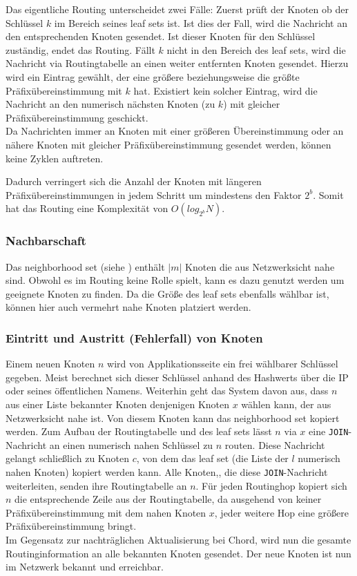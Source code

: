 Das eigentliche Routing unterscheidet zwei Fälle: Zuerst prüft der Knoten ob der Schlüssel $k$ im Bereich seines leaf sets ist. Ist dies der Fall, wird die Nachricht an den entsprechenden Knoten gesendet. Ist dieser Knoten für den Schlüssel zuständig, endet das Routing. Fällt $k$ nicht in den Bereich des leaf sets, wird die Nachricht via Routingtabelle an einen weiter entfernten Knoten gesendet. Hierzu wird ein Eintrag gewählt, der eine größere beziehungsweise die größte Präfixübereinstimmung mit $k$ hat. Existiert kein solcher Eintrag, wird die Nachricht an den numerisch nächsten Knoten (zu $k$) mit gleicher Präfixübereinstimmung geschickt.\\
Da Nachrichten immer an Knoten mit einer größeren Übereinstimmung oder an nähere Knoten mit gleicher Präfixübereinstimmung gesendet werden, können keine Zyklen auftreten.

Dadurch verringert sich die Anzahl der Knoten mit längeren Präfixübereinstimmungen in jedem Schritt um mindestens den Faktor $2^b$. Somit hat das Routing eine Komplexität von $O(log_{2^b} N)$.

\subsubsection{Nachbarschaft}
Das neighborhood set (siehe ) enthält $|m|$ Knoten die aus Netzwerksicht nahe sind. Obwohl es im Routing keine Rolle spielt, kann es dazu genutzt werden um geeignete Knoten zu finden. Da die Größe des leaf sets ebenfalls wählbar ist, können hier auch vermehrt nahe Knoten platziert werden.

\subsubsection{Eintritt und Austritt (Fehlerfall) von Knoten}
Einem neuen Knoten $n$ wird von Applikationsseite ein frei wählbarer Schlüssel gegeben. Meist berechnet sich dieser Schlüssel anhand des Hashwerts über die IP oder seines öffentlichen Namens. Weiterhin geht das System davon aus, dass $n$ aus einer Liste bekannter Knoten denjenigen Knoten $x$ wählen kann, der aus Netzwerksicht nahe ist. Von diesem Knoten kann das neighborhood set kopiert werden. Zum Aufbau der Routingtabelle und des leaf sets lässt $n$ via $x$ eine \texttt{JOIN}-Nachricht an einen numerisch nahen Schlüssel zu $n$ routen. Diese Nachricht gelangt schließlich zu Knoten $c$, von dem das leaf set (die Liste der $l$ numerisch nahen Knoten) kopiert werden kann. Alle Knoten,, die diese \texttt{JOIN}-Nachricht weiterleiten, senden ihre Routingtabelle an $n$. Für jeden Routinghop kopiert sich $n$ die entsprechende Zeile aus der Routingtabelle, da ausgehend von keiner Präfixübereinstimmung mit dem nahen Knoten $x$, jeder weitere Hop eine größere Präfixübereinstimmung bringt.\\
Im Gegensatz zur nachträglichen Aktualisierung bei Chord, wird nun die gesamte Routinginformation an alle bekannten Knoten gesendet. Der neue Knoten ist nun im Netzwerk bekannt und erreichbar.

